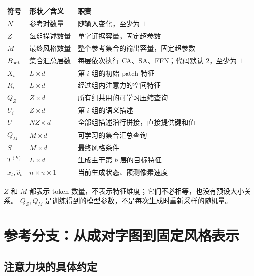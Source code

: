 \documentclass[UTF8,fontset=fandol,zihao=5,a4paper]{ctexart}
\begin{document}
\begin{center}
\small
\begin{tabularx}{\linewidth}{@{}l l X@{}}
\toprule
符号 & 形状／含义 & 职责 \\
\midrule
$N$ & 参考对数量 & 随输入变化，至少为 $1$ \\
$Z$ & 每组描述数量 & 单字证据容量，固定超参数 \\
$M$ & 最终风格数量 & 整个参考集合的输出容量，固定超参数 \\
$B_{\rm set}$ & 集合汇总层数 & 每层依次执行 CA、SA、FFN；代码默认 $2$，至少为 $1$ \\
$X_i$ & $L\times d$ & 第 $i$ 组的初始 patch 特征 \\
$R_i$ & $L\times d$ & 经过组内注意力的空间特征 \\
$Q_Z$ & $Z\times d$ & 所有组共用的可学习压缩查询 \\
$U_i$ & $Z\times d$ & 第 $i$ 组的语义描述 \\
$U$ & $NZ\times d$ & 全部组描述沿行拼接，直接提供键和值 \\
$Q_M$ & $M\times d$ & 可学习的集合汇总查询 \\
$S$ & $M\times d$ & 最终风格条件 \\
$T^{(b)}$ & $L\times d$ & 生成主干第 $b$ 层的目标特征 \\
$x_t,\widehat v_t$ & $n\times n\times1$ & 当前生成状态、预测像素速度 \\
\bottomrule
\end{tabularx}
\end{center}

$Z$ 和 $M$ 都表示 token 数量，不表示特征维度；它们不必相等，也没有预设大小关系。
$Q_Z,Q_M$ 是训练得到的模型参数，不是每次生成时重新采样的随机量。

\section{参考分支：从成对字图到固定风格表示}

\subsection{注意力块的具体约定}
\end{document}

